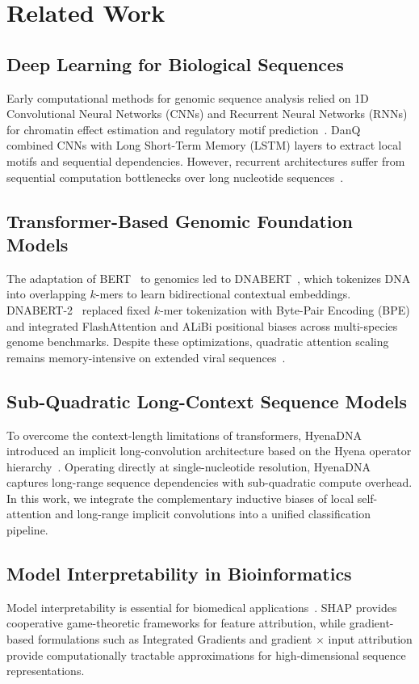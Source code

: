 \documentclass[conference]{IEEEtran}
\begin{document}
\section{Related Work}
\label{sec:related_work}

\subsection{Deep Learning for Biological Sequences}
Early computational methods for genomic sequence analysis relied on 1D Convolutional Neural Networks (CNNs) and Recurrent Neural Networks (RNNs) for chromatin effect estimation and regulatory motif prediction~\cite{zhou2015predict, lecam2017deep}. DanQ~\cite{lecam2017deep} combined CNNs with Long Short-Term Memory (LSTM) layers to extract local motifs and sequential dependencies. However, recurrent architectures suffer from sequential computation bottlenecks over long nucleotide sequences~\cite{libbrecht2015ml}.

\subsection{Transformer-Based Genomic Foundation Models}
The adaptation of BERT~\cite{devlin2019bert} to genomics led to DNABERT~\cite{ji2021dnabert}, which tokenizes DNA into overlapping $k$-mers to learn bidirectional contextual embeddings. DNABERT-2~\cite{zhou2023dnabert2} replaced fixed $k$-mer tokenization with Byte-Pair Encoding (BPE) and integrated FlashAttention and ALiBi positional biases across multi-species genome benchmarks. Despite these optimizations, quadratic attention scaling remains memory-intensive on extended viral sequences~\cite{vaswani2017attention, chen2020bigbird}.

\subsection{Sub-Quadratic Long-Context Sequence Models}
To overcome the context-length limitations of transformers, HyenaDNA~\cite{nguyen2023hyenadna} introduced an implicit long-convolution architecture based on the Hyena operator hierarchy~\cite{poli2023hyena}. Operating directly at single-nucleotide resolution, HyenaDNA captures long-range sequence dependencies with sub-quadratic compute overhead. In this work, we integrate the complementary inductive biases of local self-attention and long-range implicit convolutions into a unified classification pipeline.

\subsection{Model Interpretability in Bioinformatics}
Model interpretability is essential for biomedical applications~\cite{lundberg2017shap}. SHAP provides cooperative game-theoretic frameworks for feature attribution, while gradient-based formulations such as Integrated Gradients and gradient $\times$ input attribution provide computationally tractable approximations for high-dimensional sequence representations.
\end{document}

